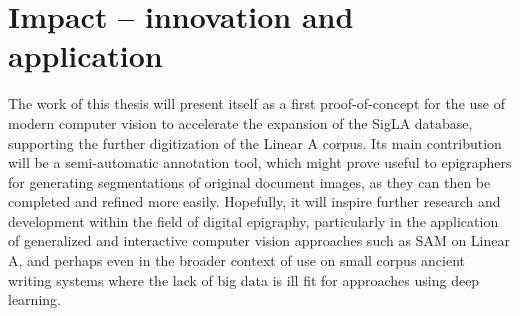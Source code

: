 \section{Impact -- innovation and application}

The work of this thesis will present itself as a first proof-of-concept for the use of modern computer vision to accelerate the expansion of the SigLA database, supporting the further digitization of the Linear A corpus. 
Its main contribution will be a semi-automatic annotation tool, which might prove useful to epigraphers for generating segmentations of original document images, as they can then be completed and refined more easily.
Hopefully, it will inspire further research and development within the field of digital epigraphy, particularly in the application of generalized and interactive computer vision approaches such as \acs{SAM} on Linear A, and perhaps even in the broader context of use on small corpus ancient writing systems where the lack of big data is ill fit for approaches using deep learning.
